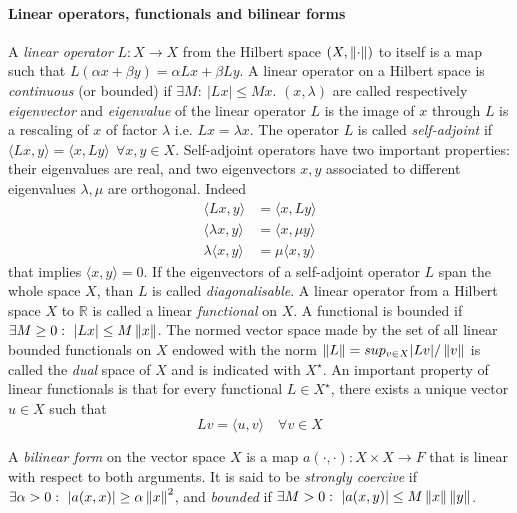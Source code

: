 \paragraph{Linear operators, functionals and bilinear forms} A \textit{linear operator} $L: X\to X$ from the Hilbert space $(X, \left\lVert\cdot\right\rVert)$ to itself is a map such that $L(\alpha x + \beta y) = \alpha L x + \beta L y$. A linear operator on a Hilbert space is \textit{continuous} (or {bounded}) if $\exists M:\ |Lx|\leq Mx$. $(x, \lambda)$ are called respectively \textit{eigenvector} and \textit{eigenvalue} of the linear operator $L$ is the image of $x$ through $L$ is a rescaling of $x$ of factor $\lambda$ i.e. $Lx = \lambda x$. The operator $L$ is called \textit{self-adjoint} if $\langle Lx, y\rangle = \langle x,Ly\rangle\ \  \forall x,y \in X$. Self-adjoint operators have two important properties: their eigenvalues are real, and two eigenvectors $x, y$ associated to different eigenvalues $\lambda, \mu$ are orthogonal. Indeed 
\begin{align*}
	\langle Lx, y\rangle &= \langle x,Ly\rangle\\
	\langle \lambda x, y\rangle &= \langle x,\mu y\rangle\\
	\lambda \langle  x, y\rangle &= \mu \langle x, y\rangle
\end{align*}
that implies $ \langle  x, y\rangle = 0$. If the eigenvectors of a self-adjoint operator $L$ span the whole space $X$, than $L$ is called \textit{diagonalisable}.  A linear operator from a Hilbert space $X$ to $\mathbb R$ is called a linear \textit{functional} on $X$. A functional is bounded if $\exists M\geq 0: \ |Lx|\leq M\norm x$. The normed vector space made by the set of all linear bounded functionals on $X$ endowed with the norm $\left\lVert L\right\rVert = sup_{v\in X}|Lv|/\left\lVert v\right\rVert$ is called the \textit{dual} space of $X$ and is indicated with $X^\star$. An important property of linear functionals is that for every functional $L\in X^\star$, there exists a unique vector $u\in X$ such that
$$Lv = \langle u, v\rangle\quad \forall v\in X$$ 

A \textit{bilinear form} on the vector space $X$ is a map $a(\cdot, \cdot): X\times X\to F$ that is linear with respect to both arguments. It is said to be \textit{strongly coercive} if $\exists\alpha>0:\ |a(x, x)|\geq \alpha \left\lVert x\right\rVert^2$, and \textit{bounded} if $\exists M>0:\ |a(x, y)|\leq M \left\lVert x\right\rVert \left\lVert y\right\rVert$.

